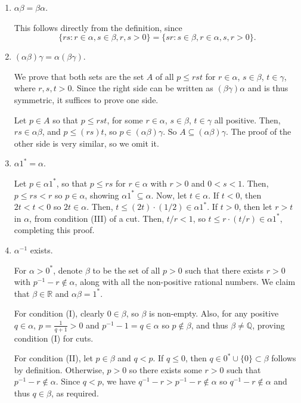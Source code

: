\documentclass{scrbook}
\newcommand{\Q}{\mathbb{Q}}
\newcommand{\R}{\mathbb{R}}
\begin{document}
\begin{enumerate}[Step 1.]
\begin{enumerate}[({M}1)]
\item $\alpha \beta = \beta \alpha$.

This follows directly from the definition, since
\[
	\{rs: r \in \alpha, s \in \beta, r, s > 0\} = \{sr: s \in \beta, r \in \alpha, s, r > 0\}.
\]

\item $(\alpha \beta) \gamma = \alpha (\beta \gamma)$.

We prove that both sets are the set $A$ of all $p \le rst$ for $r \in \alpha$, $s \in \beta$, $t \in \gamma$, where $r, s, t > 0$. Since the right side can be written as $(\beta \gamma) \alpha$ and is thus symmetric, it suffices to prove one side.

Let $p \in A$ so that $p \le rst$, for some $r \in \alpha$, $s \in \beta$, $t \in \gamma$ all positive. Then, $rs \in \alpha\beta$, and $p \le (rs)t$, so $p \in (\alpha \beta) \gamma$. So $A \subseteq (\alpha \beta) \gamma$. The proof of the other side is very similar, so we omit it.

\item $\alpha 1^* = \alpha$.

Let $p \in \alpha 1^*$, so that $p \le rs$ for $r \in \alpha$ with $r > 0$ and $0 < s < 1$. Then, $p \le rs < r$ so $ p \in \alpha$, showing $\alpha 1^* \subseteq \alpha$. Now, let $t \in \alpha$. If $t < 0$, then $2t < t < 0$ so $2t \in \alpha$. Then, $t \le (2t) \cdot (1/2) \in \alpha 1^*$. If $t > 0$, then let $r > t$ in $\alpha$, from condition (III) of a cut. Then, $t/r < 1$, so $t \le r \cdot (t/r) \in \alpha 1^*$, completing this proof.

\item $\alpha^{-1}$ exists.

For $\alpha > 0^*$, denote $\beta$ to be the set of all $p > 0$ such that there exists $r > 0$ with $p^{-1} - r \not\in \alpha$, along with all the non-positive rational numbers. We claim that $\beta \in \R$ and $\alpha\beta = 1^*$.

For condition (I), clearly $0 \in \beta$, so $\beta$ is non-empty. Also, for any positive $q \in \alpha$, $p = \frac{1}{q + 1} > 0$ and $p^{-1} - 1 = q \in \alpha$ so $p \not\in \beta$, and thus $\beta \ne \Q$, proving condition (I) for cuts. 

For condition (II), let $p \in \beta$ and $q < p$. If $q \le 0$, then $q \in 0^* \cup \{0\} \subset\beta$ follows by definition. Otherwise, $p > 0$ so there exists some $r > 0$ such that $p^{-1} - r \not\in \alpha$. Since $q < p$, we have $q^{-1} - r > p^{-1} - r \not\in \alpha$ so $q^{-1} - r \not\in \alpha$ and thus $q \in \beta$, as required. 


\end{enumerate}
\end{enumerate}
\end{document}
